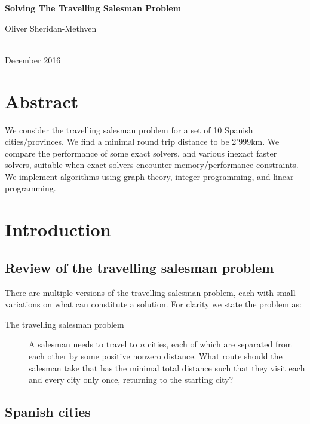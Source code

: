 \documentclass[a4paper, 11pt]{article}
\begin{document}
\begin{center}
\begin{Large}
\textbf{Solving The Travelling Salesman Problem}\\
\end{Large}
\vspace{1ex}
\begin{large}
Oliver Sheridan-Methven 
\end{large}\\
December 2016 \\
\end{center}

\section*{Abstract}
We consider the travelling salesman problem for a set of 10 Spanish cities/provinces. We find a minimal round trip distance to be 2'999\:km. We compare the performance of some exact solvers, and various inexact faster solvers, suitable when exact solvers encounter memory/performance constraints. We implement algorithms using graph theory, integer programming, and linear programming.

\section{Introduction}

\subsection{Review of the travelling salesman problem}
\label{subsec:review_of_tsp}

There are multiple versions of the travelling salesman problem, each with small variations on what can constitute a solution. For clarity we state the problem as:
\begin{description}
\item[The travelling salesman problem] A salesman needs to travel to $ n $ cities, each of which are separated from each other by some positive nonzero distance. What route should the salesman take that has the minimal total distance such that they visit each and every city only once, returning to the starting city?
\end{description}


\subsection{Spanish cities}
\label{subsec:spanish_cities}
\end{document}
